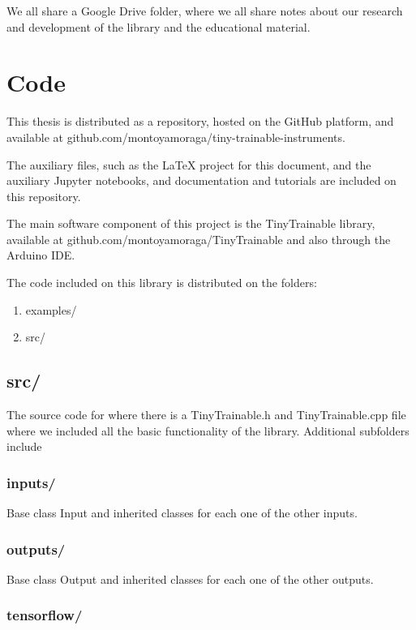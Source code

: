 We all share a Google Drive folder, where we all share notes about our research and development of the library and the educational material.

\section{Code}

This thesis is distributed as a repository, hosted on the GitHub platform, and available at github.com/montoyamoraga/tiny-trainable-instruments.

The auxiliary files, such as the LaTeX project for this document, and the auxiliary Jupyter notebooks, and documentation and tutorials are included on this repository.

The main software component of this project is the TinyTrainable library, available at github.com/montoyamoraga/TinyTrainable and also through the Arduino IDE.

The code included on this library is distributed on the folders:

\begin{enumerate}
  \item examples/
  \item src/
\end{enumerate}

\subsection{src/}

The source code for where there is a TinyTrainable.h and TinyTrainable.cpp file where we included all the basic functionality of the library. Additional subfolders include

\subsubsection{inputs/}

Base class Input and inherited classes for each one of the other inputs.

\subsubsection{outputs/}

Base class Output and inherited classes for each one of the other outputs.

\subsubsection{tensorflow/}

